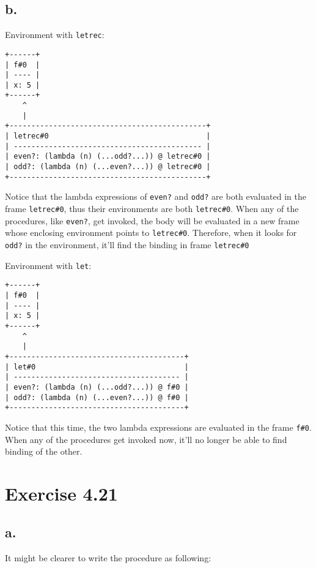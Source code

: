 \documentclass[../main.tex]{subfiles}
\begin{document}
\subsection{b.}

Environment with \lstinline{letrec}:

\begin{lstlisting}
+------+
| f#0  |
| ---- |
| x: 5 |
+------+
    ^
    |
+---------------------------------------------+
| letrec#0                                    |
| ------------------------------------------- |
| even?: (lambda (n) (...odd?...)) @ letrec#0 |
| odd?: (lambda (n) (...even?...)) @ letrec#0 |
+---------------------------------------------+
\end{lstlisting}

Notice that the lambda expressions of \lstinline{even?} and \lstinline{odd?} are both evaluated in the frame \lstinline{letrec#0}, thus their environments are both \lstinline{letrec#0}. When any of the procedures, like \lstinline{even?}, get invoked, the body will be evaluated in a new frame whose enclosing environment points to \lstinline{letrec#0}. Therefore, when it looks for \lstinline{odd?} in the environment, it'll find the binding in frame \lstinline{letrec#0}

Environment with \lstinline{let}:

\begin{lstlisting}
+------+
| f#0  |
| ---- |
| x: 5 |
+------+
    ^
    |
+----------------------------------------+
| let#0                                  |
| -------------------------------------- |
| even?: (lambda (n) (...odd?...)) @ f#0 |
| odd?: (lambda (n) (...even?...)) @ f#0 |
+----------------------------------------+
\end{lstlisting}

Notice that this time, the two lambda expressions are evaluated in the frame \lstinline{f#0}. When any of the procedures get invoked now, it'll no longer be able to find binding of the other.

\section{Exercise 4.21}

\subsection{a.}

It might be clearer to write the procedure as following:
\end{document}
